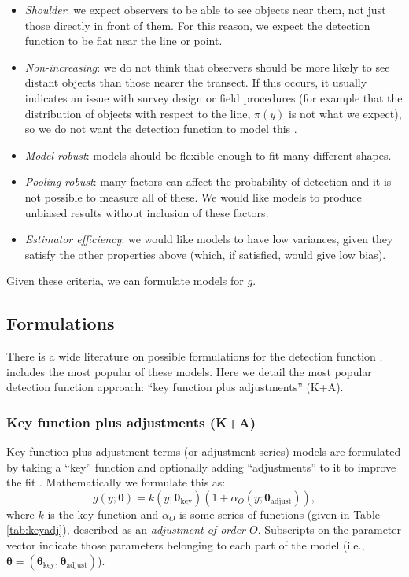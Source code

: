 \documentclass[article]{jss}\usepackage[]{graphicx}\usepackage[]{color}
\begin{document}
\begin{itemize}
\item \textit{Shoulder}: we expect observers to be able to see objects near them, not just those directly in front of them. For this reason, we expect the detection function to be flat near the line or point.
\item \textit{Non-increasing}: we do not think that observers should be more likely to see distant objects than those nearer the transect. If this occurs, it usually indicates an issue with survey design or field procedures (for example that the distribution of objects with respect to the line, $\pi(y)$ is not what we expect), so we do not want the detection function to model this \citep{Marques:2010he, Marques:2012fy, Miller:2015hw}.
\item \textit{Model robust}: models should be flexible enough to fit many different shapes.
\item \textit{Pooling robust}: many factors can affect the probability of detection and it is not possible to measure all of these. We would like models to produce unbiased results without inclusion of these factors.
\item \textit{Estimator efficiency}: we would like models to have low variances, given they satisfy the other properties above (which, if satisfied, would give low bias).
\end{itemize}

Given these criteria, we can formulate models for $g$.

\subsection{Formulations}

There is a wide literature on possible formulations for the detection function \citep{Buckland:1992fa, Eidous:2005bj, Becker:2009cj, Giammarino:2014eg, Miller:2015hw, Becker:2015fi}.  includes the most popular of these models. Here we detail the most popular detection function approach: ``key function plus adjustments'' (K+A).

\subsubsection{Key function plus adjustments (K+A)}

Key function plus adjustment terms (or adjustment series) models are formulated by taking a ``key'' function and optionally adding ``adjustments'' to it to improve the fit \citep{Buckland:1992fa}. Mathematically we formulate this as:
$$
g(y; \boldsymbol{\theta}) = k(y; \boldsymbol{\theta}_\text{key})\left( 1+ \alpha_O(y; \boldsymbol{\theta}_\text{adjust})\right),
$$
where $k$ is the key function and $\alpha_O$ is some series of functions (given in Table \ref{tab:keyadj}), described as an \textit{adjustment of order $O$}. Subscripts on the parameter vector indicate those parameters belonging to each part of the model (i.e., $\boldsymbol{\theta} = (\boldsymbol{\theta}_\text{key}, \boldsymbol{\theta}_\text{adjust})$).
\end{document}
